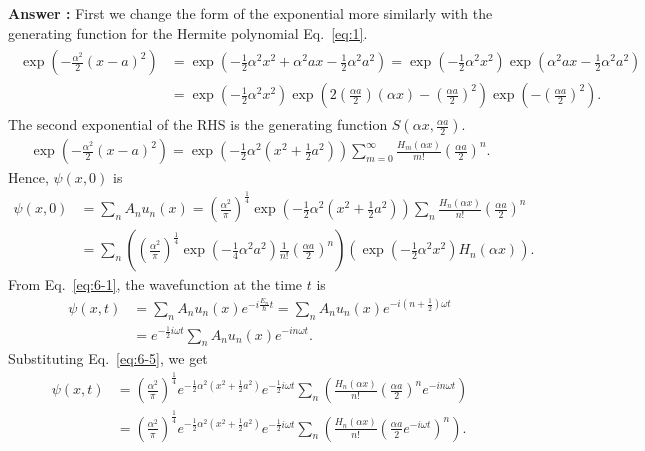 \documentclass[floatfix,nofootinbib,superscriptaddress,fleqn]{revtex4-2}
\begin{document}
\noindent \textbf{Answer : }
First we change the form of the exponential more similarly with 
the generating function for the Hermite polynomial Eq.~\eqref{eq:1}.
\begin{align}
  \begin{split}\label{eq:6-3}
    \exp{\left(-\frac{\alpha^2}{2}(x-a)^2\right)}
    &= \exp{\left(-\frac{1}{2}\alpha^2x^2+\alpha^2 ax
    -\frac{1}{2}\alpha^2a^2\right)}
    =\exp{\left(-\frac{1}{2}\alpha^2x^2\right)
    \exp\left(\alpha^2 ax-\frac{1}{2}\alpha^2a^2\right)}  \\
    &= \exp{\left(-\frac{1}{2}\alpha^2x^2\right)
    \exp\left(2\left(\frac{\alpha a}{2}\right)(\alpha x)
    -\left(\frac{\alpha a}{2}\right)^2\right)}
    \exp \left(-\left(\frac{\alpha a}{2}\right)^2\right).
  \end{split}
\end{align}
The second exponential of the RHS is the generating function
$S\left(\alpha x, \frac{\alpha a}{2}\right)$.
\begin{align}%
  \exp{\left(-\frac{\alpha^2}{2}(x-a)^2\right)}
  =\exp{\left(-\frac{1}{2}\alpha^2\left(x^2+\frac{1}{2}a^2\right)
  \right)}
  \sum_{m=0}^{\infty}\frac{H_m(\alpha x)}{m!}\left(\frac{\alpha a}{2}
  \right)^n.
\end{align}
Hence, $\psi(x,0)$ is
\begin{align}\label{eq:6-5}
    \psi(x,0) &= \sum_n A_n u_n(x) =
    \left(\frac{\alpha^2}{\pi}\right)^{\frac{1}{4}}
    \exp{\left(-\frac{1}{2}\alpha^2\left(x^2+\frac{1}{2}a^2\right)
    \right)}
    \sum_n\frac{H_n(\alpha x)}{n!}\left(\frac{\alpha a}{2}
    \right)^n \\
    \label{eq:6-5-1}  &=\sum_n
    \left(\left(\frac{\alpha^2}{\pi}\right)^{\frac{1}{4}}
    \exp{\left(-\frac{1}{4}\alpha^2a^2\right)}
    \frac{1}{n!}\left(\frac{\alpha a}{2}\right)^n\right)
    \left(\exp{\left(-\frac{1}{2}\alpha^2x^2\right)}
    H_n(\alpha x)\right).
\end{align}
From Eq.~\eqref{eq:6-1}, the wavefunction at the time $t$ is
\begin{align}
    \psi(x,t) &= \sum_n A_nu_n(x)e^{-i\frac{E_n}{\hbar}t}
    =\sum_n A_nu_n(x)e^{-i\left(n+\frac{1}{2}\right)\omega t}  \\
    &=e^{-\frac{1}{2}i\omega t}
    \sum_n A_nu_n(x)e^{-in\omega t}.
\end{align}
Substituting Eq.~\eqref{eq:6-5}, we get
\begin{align}
    \psi(x,t) &=
    \left(\frac{\alpha^2}{\pi}\right)^{\frac{1}{4}}
    e^{-\frac{1}{2}\alpha^2\left(x^2+\frac{1}{2}a^2\right)}
    e^{-\frac{1}{2}i\omega t}
    \sum_n\left(\frac{H_n(\alpha x)}{n!}
    \left(\frac{\alpha a}{2}\right)^n
    e^{-in\omega t} \right) \\
    &=\left(\frac{\alpha^2}{\pi}\right)^{\frac{1}{4}}
    e^{-\frac{1}{2}\alpha^2\left(x^2+\frac{1}{2}a^2\right)}
    e^{-\frac{1}{2}i\omega t}
    \sum_n\left(\frac{H_n(\alpha x)}{n!}
    \left(\frac{\alpha a}{2}e^{-i\omega t} \right)^n
    \right).
\end{align}
\end{document}
